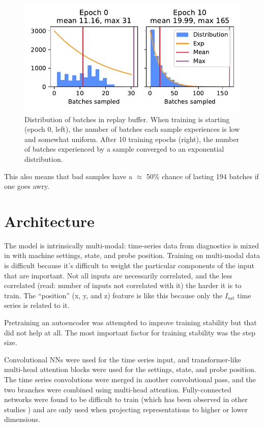 \begin{figure}
	\centering
	\includegraphics[width=350pt]{figures/buffer_distributions.pdf}
	\caption[Distribution of batches in replay buffer samples]{\label{fig:buffer_distribution}Distribution of batches in replay buffer. When training is starting (epoch 0, left), the number of batches each sample experiences is low and somewhat uniform. After 10 training epochs (right), the number of batches experienced by a sample converged to an exponential distribution.}
\end{figure}

This also means that bad samples have a $\approx$ 50\% chance of lasting 194 batches if one goes awry.

\section{Architecture}

The model is intrinsically multi-modal: time-series data from diagnostics is mixed in with machine settings, state, and probe position. Training on multi-modal data is difficult because it's difficult to weight the particular components of the input that are important. Not all inputs are necessarily correlated, and the less correlated (read: number of inputs not correlated with it) the harder it is to train. The ``position'' (x, y, and z) feature is like this because only the $I_\text{sat}$ time series is related to it.

Pretraining an autoencoder was attempted to improve training stability but that did not help at all. The most important factor for training stability was the step size.

Convolutional NNs were used for the time series input, and transformer-like multi-head attention blocks were used for the settings, state, and probe position. The time series convolutions were merged in another convolutional pass, and the two branches were combined using multi-head attention. Fully-connected networks were found to be difficult to train (which has been observed in other studies \cite{cheng_versatile_2024}) and are only used when projecting representations to higher or lower dimensions.

